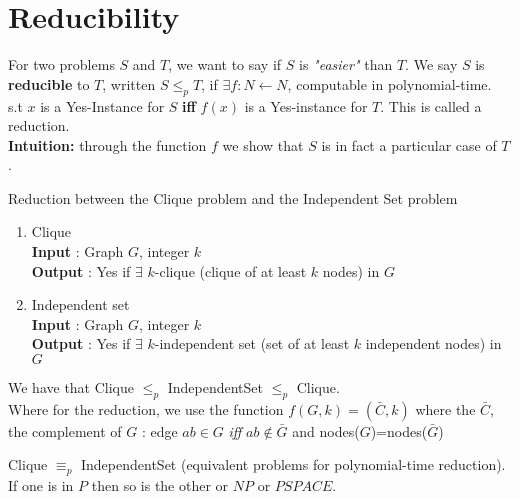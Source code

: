 \section{Reducibility}
For two problems $S$ and $T$, we want to say if $S$ is \textit{"easier"} than $T$.
We say $S$ is \textbf{reducible} to $T$, written $S \leq_p T$, 
if $\exists f:N\leftarrow N$, computable in polynomial-time. \\
s.t $x$ is a Yes-Instance for $S$ \textbf{iff} $f(x)$ is a Yes-instance for $T$.
This is called a reduction.\\
\textbf{Intuition:} through the function $f$ we show that $S$ is in fact a particular case of $T$.\\

\begin{leftbar}
\begin{example} Reduction between the Clique problem and the Independent Set problem
\begin{enumerate}
	\item Clique\\
\textbf{Input} : Graph $G$, integer $k$\\
\textbf{Output} : Yes if $\exists$ $k$-clique (clique of at least $k$ nodes) in $G$
\item Independent set\\
\textbf{Input} : Graph $G$, integer $k$\\
\textbf{Output} : Yes if $\exists$ $k$-independent set (set of at least $k$ independent nodes) in $G$
\end{enumerate}

We have that Clique $\leq_p$ IndependentSet $\leq_p$ Clique.\\
Where for the reduction, we use the function $f(G,k) = (\bar{C}, k)$ where the $\bar{C}$, the complement of $G$ : edge $ab \in G$ \emph{iff} $ab\notin \bar{G}$ and nodes($G$)=nodes($\bar{G}$)
\end{example}
\end{leftbar}

\begin{remark} Clique $\equiv_p$ IndependentSet (equivalent problems for polynomial-time reduction). If one is in $P$ then so is the other or $NP$ or $PSPACE$.
\end{remark}

